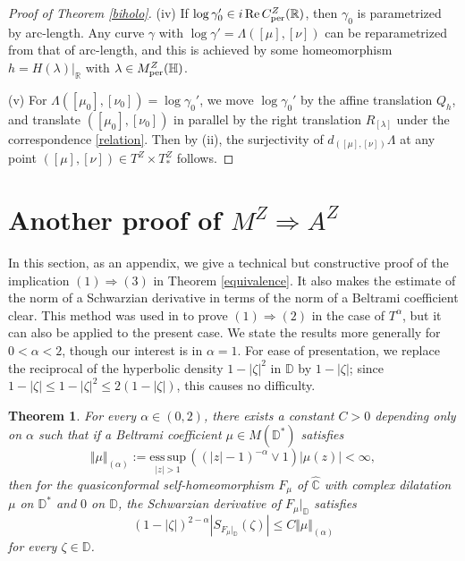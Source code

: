 \documentclass[amstex]{amsart}
\newtheorem{theorem}{Theorem}[section]
\theoremstyle{definition}
\theoremstyle{remark}
\numberwithin{equation}{section}
\begin{document}
\begin{proof}[Proof of Theorem \ref{biholo}]
(iv)
If $\log \gamma_0' \in i\,{\rm Re}\,C^Z_{\rm per}(\mathbb R)$, then $\gamma_0$ is parametrized by arc-length.
Any curve $\gamma$ with $\log \gamma' = \Lambda([\mu],[\nu])$ can be reparametrized from that of arc-length, and
this is achieved by some homeomorphism $h=H(\lambda)|_{\mathbb R}$ with $\lambda \in M_{\rm per}^Z(\mathbb H)$.

(v)
For $\Lambda([\mu_0],[\nu_0]) = \log \gamma_0'$,
we move $\log \gamma_0'$ by the affine translation $Q_{h}$, and
translate $([\mu_0],[\nu_0])$ in parallel by the right translation $R_{[\lambda]}$
under the correspondence \eqref{relation}.
Then by (ii), 
the surjectivity of $d_{([\mu],[\nu])}\Lambda$ at any point $([\mu],[\nu]) \in T^Z \times T^Z_*$ follows.
\end{proof}



\section{Another proof of $M^Z \Rightarrow A^Z$}\label{7}

In this section, as an appendix, we give a technical but constructive proof of the implication $(1) \Rightarrow (3)$ in
Theorem \ref{equivalence}. It also makes the estimate of the norm of a Schwarzian derivative
in terms of the norm of a Beltrami coefficient clear.
This method was used in \cite[Theorem 4.1]{M1} to prove $(1) \Rightarrow (2)$ in the case of $T^\alpha$,
but it can also be applied to the present case.
We state the results more generally for $0<\alpha<2$, though our interest is in $\alpha=1$.
For ease of presentation, we replace the reciprocal of the hyperbolic density $1-|\zeta|^2$ in $\mathbb D$ by $1-|\zeta|$; since
$1-|\zeta| \leq 1-|\zeta|^2 \leq 2(1-|\zeta|)$, this causes no difficulty.

\begin{theorem}\label{alpha2}
For every $\alpha \in (0,2)$, there exists a constant $C>0$ depending only on $\alpha$
such that if a Beltrami coefficient $\mu \in M(\mathbb D^*)$ satisfies
$$
\Vert \mu \Vert_{(\alpha)}:=\underset{|z|>1}{\mathrm{ess\,sup}}\, ((|z|-1)^{-\alpha} \lor 1)|\mu(z)|<\infty,
$$
then for the quasiconformal self-homeomorphism $F_\mu$ of $\widehat{\mathbb C}$ with complex dilatation $\mu$ on $\mathbb D^*$
and $0$ on $\mathbb D$, the Schwarzian derivative of $F_\mu|_{\mathbb D}$ satisfies
$$
(1-|\zeta|)^{2-\alpha}|S_{F_\mu|_{\mathbb D}}(\zeta)| \leq C \Vert \mu \Vert_{(\alpha)}
$$
for every $\zeta \in \mathbb D$.
\end{theorem}
\end{document}
